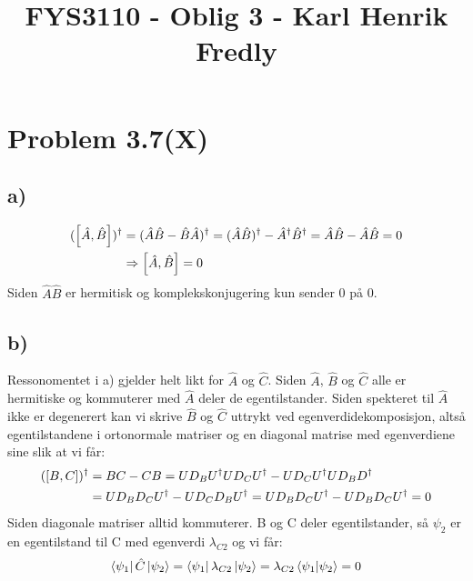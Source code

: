 \documentclass[norsk,a4paper,12pt]{article}
\title{FYS3110 - Oblig 3 - Karl Henrik Fredly}
\begin{document}
	
	\maketitle
	
\section*{Problem 3.7(X)}

	\subsection*{a)}
		\begin{equation}
		\begin{aligned}
		(\comm{\hat{A}}{\hat{B}})^\dagger &= (\hat{A}\hat{B} - \hat{B}\hat{A})^\dagger = (\hat{A}\hat{B})^\dagger - \hat{A}^\dagger\hat{B}^\dagger = \hat{A}\hat{B} - \hat{A}\hat{B} = 0 \\
		&\Rightarrow \comm{\hat{A}}{\hat{B}} = 0
		\end{aligned}
		\end{equation}
		Siden $\hat{A}\hat{B}$ er hermitisk og komplekskonjugering kun sender 0 på 0.
		
	\subsection*{b)}
		Ressonomentet i a) gjelder helt likt for $\hat{A}$ og $\hat{C}$. Siden $\hat{A}$, $\hat{B}$ og $\hat{C}$ alle er hermitiske og kommuterer med $\hat{A}$ deler de egentilstander. Siden spekteret til $\hat{A}$ ikke er degenerert kan vi skrive $\hat{B}$ og $\hat{C}$ uttrykt ved egenverdidekomposisjon, altså egentilstandene i ortonormale matriser og en diagonal matrise med egenverdiene sine slik at vi får:
		\begin{equation}
		\begin{aligned}
		(\comm{B}{C})^\dagger &= BC - CB = UD_BU^\dagger UD_CU^\dagger - UD_CU^\dagger UD_BD^\dagger \\
		&= UD_B D_CU^\dagger - UD_CD_BU^\dagger = UD_B D_CU^\dagger - UD_BD_CU^\dagger = 0
		\end{aligned}
		\end{equation}
		Siden diagonale matriser alltid kommuterer. B og C deler egentilstander, så $\psi_2$ er en egentilstand til C med egenverdi $\lambda_{C2}$ og vi får:
		\begin{equation}
		\begin{aligned}
		\bra{\psi_1}\hat{C}\ket{\psi_2} = \bra{\psi_1}\lambda_{C2}\ket{\psi_2} = \lambda_{C2}\bra{\psi_1}\ket{\psi_2} = 0
		\end{aligned}
		\end{equation}
		
\end{document}
